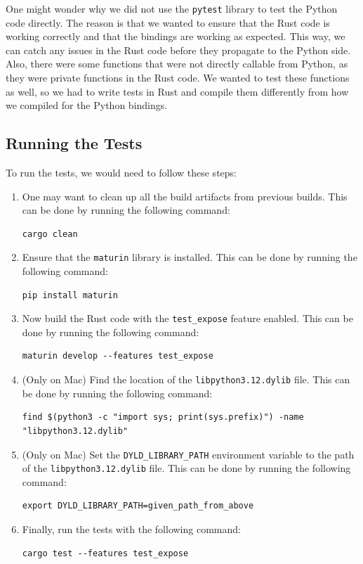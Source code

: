 \documentclass[review]{AIM_report}
\begin{document}
One might wonder why we did not use the \texttt{pytest} library to test the Python code directly. The reason is that we wanted to ensure that the Rust code is working correctly and that the bindings are working as expected. This way, we can catch any issues in the Rust code before they propagate to the Python side.
Also, there were some functions that were not directly callable from Python, as they were private functions in the Rust code. We wanted to test these functions as well, so we had to write tests in Rust and compile them differently from how we compiled for the Python bindings.

\subsection{Running the Tests}
To run the tests, we would need to follow these steps:
\begin{enumerate}
    \item One may want to clean up all the build artifacts from previous builds. This can be done by running the following command:
          \begin{verbatim}cargo clean
    \end{verbatim}
    \item Ensure that the \texttt{maturin} library is installed. This can be done by running the following command:
          \begin{verbatim}pip install maturin
    \end{verbatim}
    \item Now build the Rust code with the \texttt{test\_expose} feature enabled. This can be done by running the following command:
          \begin{verbatim}maturin develop --features test_expose
    \end{verbatim}
    \item (Only on Mac) Find the location of the \texttt{libpython3.12.dylib} file. This can be done by running the following command:
          \begin{verbatim}find $(python3 -c "import sys; print(sys.prefix)") -name "libpython3.12.dylib"
    \end{verbatim}
    \item (Only on Mac) Set the \texttt{DYLD\_LIBRARY\_PATH} environment variable to the path of the \texttt{libpython3.12.dylib} file. This can be done by running the following command:
          \begin{verbatim}export DYLD_LIBRARY_PATH=given_path_from_above
    \end{verbatim}
    \item Finally, run the tests with the following command:
          \begin{verbatim}cargo test --features test_expose
    \end{verbatim}
\end{enumerate}
\end{document}
